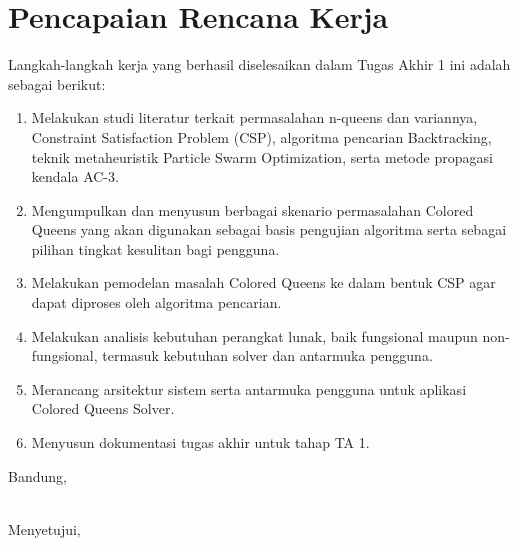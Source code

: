 \documentclass[a4paper,twoside]{article}
\begin{document}
	
	\section{Pencapaian Rencana Kerja}
	Langkah-langkah kerja yang berhasil diselesaikan dalam Tugas Akhir 1 ini adalah sebagai berikut:
	\begin{enumerate}
		\item Melakukan studi literatur terkait permasalahan n-queens dan variannya, Constraint Satisfaction Problem (CSP), algoritma pencarian Backtracking, teknik metaheuristik Particle Swarm Optimization, serta metode propagasi kendala AC-3.
		\item Mengumpulkan dan menyusun berbagai skenario permasalahan Colored Queens yang akan digunakan sebagai basis pengujian algoritma serta sebagai pilihan tingkat kesulitan bagi pengguna.
		\item Melakukan pemodelan masalah Colored Queens ke dalam bentuk CSP agar dapat diproses oleh algoritma pencarian.
		\item Melakukan analisis kebutuhan perangkat lunak, baik fungsional maupun non-fungsional, termasuk kebutuhan solver dan antarmuka pengguna.
		\item Merancang arsitektur sistem serta antarmuka pengguna untuk aplikasi Colored Queens Solver.
		\item Menyusun dokumentasi tugas akhir untuk tahap TA 1.
	\end{enumerate}
	
	\vspace{1cm}
	\centering Bandung, \tanggal\\
	\vspace{2cm} \nama \\ 
	\vspace{1cm}
	
	Menyetujui, \\
\end{document}

